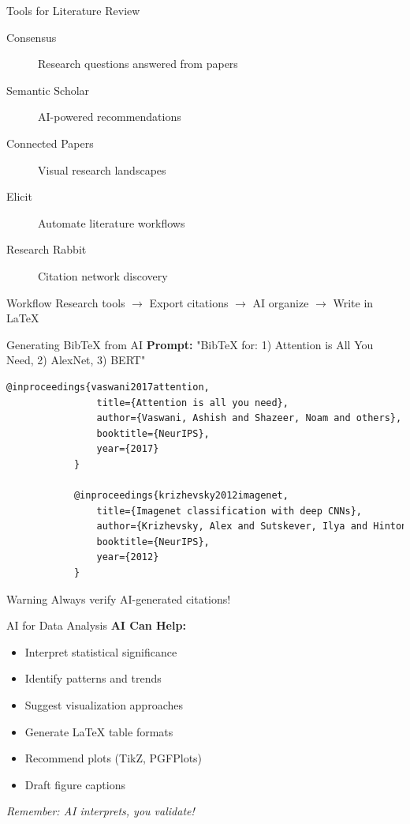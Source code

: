 \documentclass[aspectratio=169]{beamer}
\begin{document}
	\begin{frame}{Tools for Literature Review}
		\begin{description}
			\item[Consensus] Research questions answered from papers
			\item[Semantic Scholar] AI-powered recommendations
			\item[Connected Papers] Visual research landscapes
			\item[Elicit] Automate literature workflows
			\item[Research Rabbit] Citation network discovery
		\end{description}
		
		\vspace{0.5em}
		
		\begin{exampleblock}{Workflow}
			Research tools $\rightarrow$ Export citations $\rightarrow$ AI organize $\rightarrow$ Write in LaTeX
		\end{exampleblock}
	\end{frame}
	
	\begin{frame}[fragile]{Generating BibTeX from AI}
		\textbf{Prompt:} "BibTeX for: 1) Attention is All You Need, 2) AlexNet, 3) BERT"
		
		\vspace{0.3em}
		
		\begin{lstlisting}[language=TeX,basicstyle=\ttfamily\tiny]
			@inproceedings{vaswani2017attention,
				title={Attention is all you need},
				author={Vaswani, Ashish and Shazeer, Noam and others},
				booktitle={NeurIPS},
				year={2017}
			}
			
			@inproceedings{krizhevsky2012imagenet,
				title={Imagenet classification with deep CNNs},
				author={Krizhevsky, Alex and Sutskever, Ilya and Hinton, G.},
				booktitle={NeurIPS},
				year={2012}
			}
		\end{lstlisting}
		
		\begin{alertblock}{Warning}
			\small Always verify AI-generated citations!
		\end{alertblock}
	\end{frame}
	
	\begin{frame}{AI for Data Analysis}
		\textbf{AI Can Help:}
		\begin{itemize}
			\item Interpret statistical significance
			\item Identify patterns and trends
			\item Suggest visualization approaches
			\item Generate LaTeX table formats
			\item Recommend plots (TikZ, PGFPlots)
			\item Draft figure captions
		\end{itemize}
		
		\vspace{0.5em}
		
		\textit{Remember: AI interprets, you validate!}
	\end{frame}
	
\end{document}
